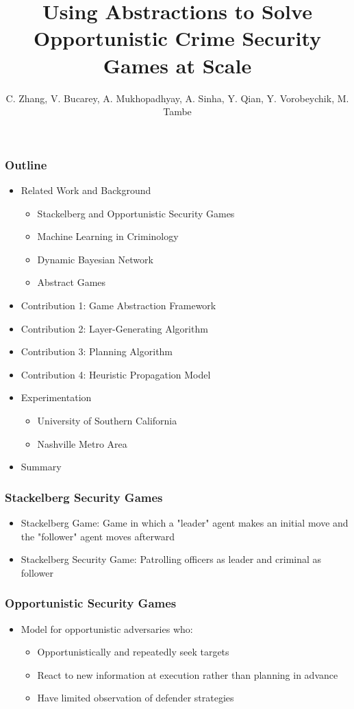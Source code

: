 \documentclass{beamer}
\title{Using Abstractions to Solve Opportunistic Crime Security Games at Scale}
\author{C. Zhang, V. Bucarey, A. Mukhopadhyay, A. Sinha, Y. Qian, Y. Vorobeychik, M. Tambe}
\begin{document}
	\frame{\titlepage}
	\begin{frame}
		\frametitle{Outline}
		\begin{itemize}
			\item Related Work and Background
				\begin{itemize}
					\item Stackelberg and Opportunistic Security Games
					\item Machine Learning in Criminology
					\item Dynamic Bayesian Network
					\item Abstract Games
				\end{itemize}
			\item Contribution 1: Game Abstraction Framework
			\item Contribution 2: Layer-Generating Algorithm
			\item Contribution 3: Planning Algorithm
			\item Contribution 4: Heuristic Propagation Model
			\item Experimentation
				\begin{itemize}
					\item University of Southern California
					\item Nashville Metro Area
				\end{itemize}
			\item Summary
		\end{itemize}
	\end{frame}

	\begin{frame}
		\frametitle{Stackelberg Security Games}
		\begin{itemize}
			\item Stackelberg Game: Game in which a "leader" agent makes an initial move and the "follower" agent moves afterward
			\item Stackelberg Security Game: Patrolling officers as leader and criminal as follower
		\end{itemize}
	\end{frame}

	\begin{frame}
		\frametitle{Opportunistic Security Games}
		\begin{itemize}
			\item Model for opportunistic adversaries who:
			\begin{itemize}
				\item Opportunistically and repeatedly seek targets
				\item React to new information at execution rather than planning in advance
				\item Have limited observation of defender strategies
			\end{itemize}
		\end{itemize}
	\end{frame}
\end{document}
